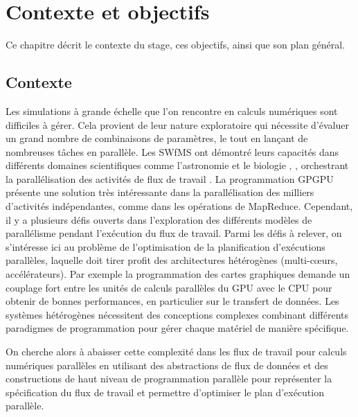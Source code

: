 
\chapter{Contexte et objectifs}
Ce chapitre décrit le contexte du stage, ces objectifs, ainsi que son plan général.
\section{Contexte}
\label{p2}
Les simulations à grande échelle que l’on rencontre en calculs numériques sont difficiles à gérer. Cela provient de leur nature exploratoire qui nécessite d’évaluer un grand nombre de combinaisons de paramètres, le tout en lançant de nombreuses tâches en parallèle. Les SWfMS ont démontré leurs capacités dans différents domaines scientifiques comme l'astronomie et le biologie \cite{oli}, \cite{dia}, orchestrant la parallélisation des activités de flux de travail \cite{bux}. La programmation GPGPU présente une solution très intéressante dans la parallélisation des milliers d'activités indépendantes, comme dans les opérations de MapReduce. Cependant, il y a plusieurs défis ouverts dans l'exploration des différents modèles de parallélisme pendant l'exécution du flux de travail. Parmi les défis à relever, on s'intéresse ici au problème de l'optimisation de la planification d'exécutions parallèles, laquelle doit tirer profit des architectures hétérogènes (multi-c{\oe}urs, accélérateurs). Par exemple la programmation des cartes graphiques demande un couplage fort entre les unités de calculs parallèles du GPU avec le CPU pour obtenir de bonnes performances, en particulier sur le transfert de données. Les systèmes hétérogènes nécessitent des conceptions complexes combinant différents paradigmes de programmation pour gérer chaque matériel de manière spécifique. 

On cherche alors à abaisser cette complexité dans les flux de travail pour calculs numériques parallèles en utilisant des abstractions de flux de données et des constructions de haut niveau de programmation parallèle pour représenter la spécification du flux de travail et permettre d'optimiser le plan d'exécution parallèle.


